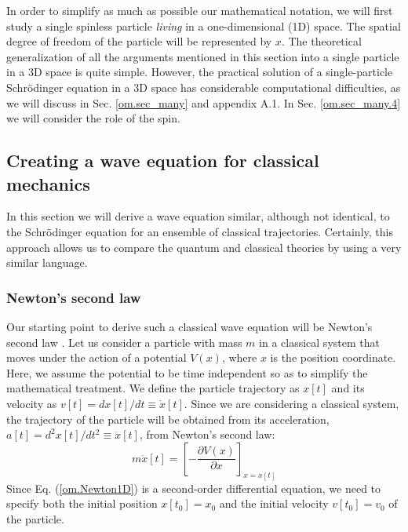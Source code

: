 \documentclass[onecolumn,nofootinbib, secnumarabic, amsmath, nobibnotes,12pt,aps,pra]{revtex4-1}
\newcommand{\sref}[1]{Sec. \ref{#1}}
\newcommand{\eref}[1]{Eq. (\ref{#1})}
\begin{document}
In order to simplify as much as possible our mathematical notation,
we will first study a single spinless particle \textit{living} in a
one-dimensional (1D) space. The spatial  degree of freedom of the particle will be represented by $x$. The theoretical generalization
of all the arguments mentioned in this section into a single
particle in a 3D space is quite simple. However, the practical
solution of a single-particle Schr\"odinger equation in a 3D space
has considerable computational difficulties, as we will discuss in
\sref{om.sec_many}
and appendix A.1. In \sref{om.sec_many.4} we will consider the
role of the spin.

\subsection{Creating a wave equation for classical mechanics}\label{om.sec.single_2}

In this section we will derive a wave equation similar, although not
identical, to the Schr\"odinger equation for an ensemble of
classical trajectories. Certainly, this approach allows us to
compare the quantum and classical theories by using a very similar
language.

\subsubsection{Newton's second law}

Our starting point to derive such a classical wave equation will be
Newton's second law \cite{om.Feynmann1963}. Let us consider a particle with
mass $m$ in a classical system that moves under the action of a
potential $V(x)$, where $x$ is the position coordinate. Here, we
assume the potential to be time independent so as to simplify the
mathematical treatment. We define the particle trajectory as $x[t]$
and its velocity as $v[t] = dx[t]/dt\equiv\dot{x}[t]$. Since we are
considering a classical system, the trajectory of the particle will
be obtained from its acceleration, $a[t] =
d^2x[t]/dt^2\equiv\ddot{x}[t]$, from Newton's second law:
\begin{equation} \label{om.Newton1D}
m \ddot{x}[t] = \left [-\frac{\partial V(x)}{\partial x} \right ] _{x = x[t]}
\end{equation}
Since \eref{om.Newton1D} is a second-order differential equation, we need to specify both the initial position $x[t_0] = x_0$ and the initial velocity $v[t_0] = v_0$ of the particle.
\end{document}
